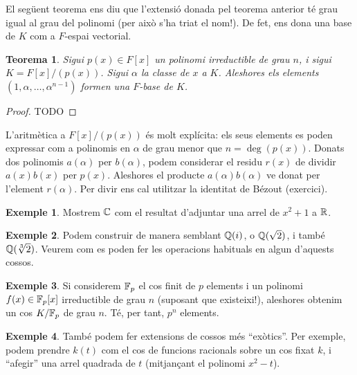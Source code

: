 \documentclass[
]{book}
\newtheorem{theorem}{Teorema}[chapter]
\theoremstyle{definition}
\theoremstyle{definition}
\newtheorem{example}{Exemple}[chapter]
\theoremstyle{definition}
\theoremstyle{definition}
\theoremstyle{remark}
\begin{document}
El següent teorema ens diu que l'extensió donada pel teorema anterior té grau igual al grau del polinomi (per això s'ha triat
el nom!). De fet, ens dona una base de \(K\) com a \(F\)-espai vectorial.

\begin{theorem}
\protect\hypertarget{thm:ext-arrel-base}{}\label{thm:ext-arrel-base}Sigui \(p(x)\in F[x]\) un polinomi irreductible de grau \(n\), i sigui \(K=F[x]/(p(x))\). Sigui \(\alpha\) la classe de \(x\) a \(K\).
Aleshores els elements \((1,\alpha,\ldots,\alpha^{n-1})\) formen una \(F\)-base de \(K\).
\end{theorem}

\begin{proof}
TODO
\end{proof}

L'aritmètica a \(F[x]/(p(x))\) és molt explícita: els seus elements es poden expressar com a polinomis en \(\alpha\) de grau
menor que \(n=\deg(p(x))\). Donats dos polinomis \(a(\alpha)\) per \(b(\alpha)\), podem considerar
el residu \(r(x)\) de dividir \(a(x)b(x)\) per \(p(x)\). Aleshores el producte \(a(\alpha)b(\alpha)\) ve donat per l'element \(r(\alpha)\).
Per divir ens cal utilitzar la identitat de Bézout (exercici).

\begin{example}
Mostrem \(\mathbb{C}\) com el resultat d'adjuntar una arrel de \(x^2+1\) a \(\mathbb{R}\).
\end{example}

\begin{example}
Podem construir de manera semblant \(\mathbb{Q}(i)\), o \(\mathbb{Q}(\sqrt{2})\), i també \(\mathbb{Q}(\sqrt[3]{2})\). Veurem com es
poden fer les operacions habituals en algun d'aquests cossos.
\end{example}

\begin{example}
Si considerem \(\mathbb{F}_p\) el cos finit de \(p\) elements i un polinomi \(f(x)\in \mathbb{F}_p[x]\) irreductible de grau \(n\)
(suposant que existeixi!), aleshores obtenim un cos \(K/\mathbb{F}_p\) de grau \(n\). Té, per tant, \(p^n\) elements.
\end{example}

\begin{example}
També podem fer extensions de cossos més ``exòtics''. Per exemple, podem prendre \(k(t)\) com el cos de funcions
racionals sobre un cos fixat \(k\), i ``afegir'' una arrel quadrada de \(t\) (mitjançant el polinomi \(x^2-t\)).
\end{example}
\end{document}
